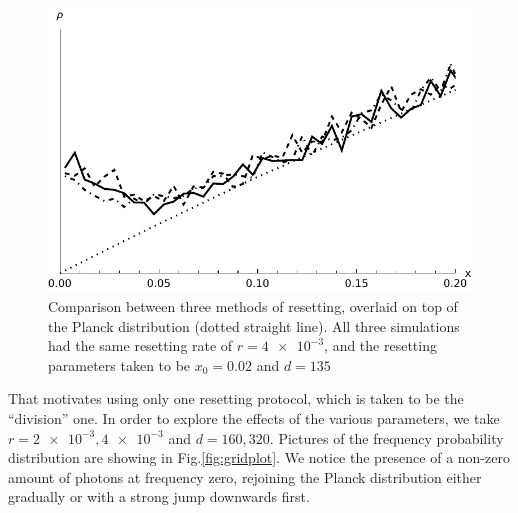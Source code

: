 \documentclass[a4paper,12pt,reqno,superscriptaddress,nofootinbib]{article}
\theoremstyle{plain}
\theoremstyle{definition}
\theoremstyle{remark}
\newcommand{\0}{^{(0)}}
\newcommand{\1}{^{(1)}}
\newcommand{\2}{^{(2)}}
\begin{document}
\begin{figure}
	\includegraphics[width=\textwidth]{spd_compare.pdf}
	\caption{Comparison between three methods of resetting, overlaid on top of the Planck distribution (dotted straight line). All three simulations had the same resetting rate of $r=\num{4e-3}$, and the resetting parameters taken to be $x_0 = 0.02$ and $d=135$}\label{fig:compare}
\end{figure}

That motivates  using only one resetting protocol, which is taken to be the ``division'' one. In order to explore the effects of the various parameters, we take $r=\num{2e-3}, \num{4e-3}$ and $d=160,320$. Pictures of the frequency probability distribution are showing in Fig.\ref{fig:gridplot}. We notice the presence of a non-zero amount of photons at frequency zero, rejoining the Planck distribution either gradually or with a strong jump downwards first.
\end{document}
